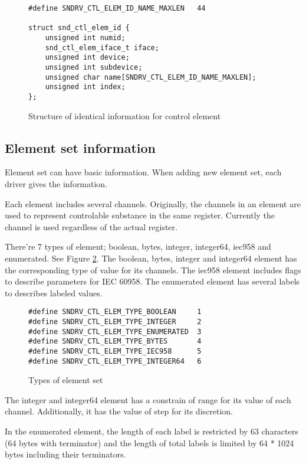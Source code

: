 \documentclass[onecolumn]{article}
\begin{document}
\begin{figure}[htbp]
\small
\begin{verbatim}
#define SNDRV_CTL_ELEM_ID_NAME_MAXLEN	44

struct snd_ctl_elem_id {
    unsigned int numid;
    snd_ctl_elem_iface_t iface;
    unsigned int device;
    unsigned int subdevice;
    unsigned char name[SNDRV_CTL_ELEM_ID_NAME_MAXLEN];
    unsigned int index;
};
\end{verbatim}
\caption{{Structure of identical information for control element}}
\label{fig:control-element-id}
\end{figure}


\subsection{Element set information}

Element set can have basic information. When adding new element set, each driver gives the information.

Each element includes several channels. Originally, the channels in an element are used to represent controlable substance in the same register. Currently the channel is used regardless of the actual register.

There're 7 types of element; boolean, bytes, integer, integer64, iec958 and enumerated. See Figure \ref{fig:element-set-types}. The boolean, bytes, integer and integer64 element has the corresponding type of value for its channels. The iec958 element includes flags to describe parameters for IEC 60958. The enumerated element has several labels to describes labeled values.

\begin{figure}[htbp]
\small
\begin{verbatim}
#define SNDRV_CTL_ELEM_TYPE_BOOLEAN     1
#define SNDRV_CTL_ELEM_TYPE_INTEGER     2
#define SNDRV_CTL_ELEM_TYPE_ENUMERATED  3
#define SNDRV_CTL_ELEM_TYPE_BYTES       4
#define SNDRV_CTL_ELEM_TYPE_IEC958      5
#define SNDRV_CTL_ELEM_TYPE_INTEGER64   6
\end{verbatim}
\caption{{Types of element set}}
\label{fig:element-set-types}
\end{figure}

The integer and integer64 element has a constrain of range for its value of each channel. Additionally, it has the value of step for its discretion.

In the enumerated element, the length of each label is restricted by 63 characters (64 bytes with terminator) and the length of total labels is limited by 64 * 1024 bytes including their terminators.
\end{document}
